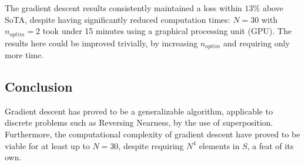 The gradient descent results consistently maintained a loss within $13\%$ above SoTA, despite having significantly reduced computation times: $N=30$ with $n_{optim}=2$ took under 15 minutes using a graphical processing unit (GPU). The results here could be improved trivially, by increasing $n_{optim}$ and requiring only more time.

\subsection{Conclusion}%
\label{sub:conclusion}
Gradient descent has proved to be a generalizable algorithm, applicable to discrete problems such as Reversing Nearness, by the use of superposition. Furthermore, the computational complexity of gradient descent have proved to be viable for at least up to $N=30$, despite requiring $N^4$ elements in  $S$, a feat of its own.
